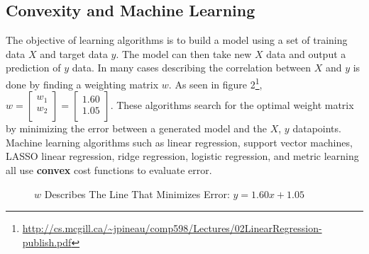 \documentclass{article}
\theoremstyle{definition}
\begin{document}
\subsection{Convexity and Machine Learning}
The objective of learning algorithms is to build a model using a set of training data $X$ and target data $y$. The model can then take new $X$ data and output a prediction of $y$ data. In many cases describing the correlation between $X$ and $y$ is done by finding a weighting matrix $w$. As seen in figure 2\footnote{\url{http://cs.mcgill.ca/~jpineau/comp598/Lectures/02LinearRegression-publish.pdf}}, 
$
    w =
    \begin{bmatrix}
        w_{1}\\
        w_{2}\\
    \end{bmatrix}
    = 
    \begin{bmatrix}
        1.60\\
        1.05\\
    \end{bmatrix}
$. These algorithms search for the optimal weight matrix by minimizing the error between a generated model and the $X$, $y$ datapoints. Machine learning algorithms such as linear regression, support vector machines, LASSO linear regression, ridge regression, logistic regression, and metric learning all use \textbf{convex} cost functions to evaluate error.\\

\begin{figure}[!ht]
    \centering
    \caption[]{$w$ Describes The Line That Minimizes Error: $y = 1.60x + 1.05$}
    \label{wsolved}
\end{figure}
\end{document}
